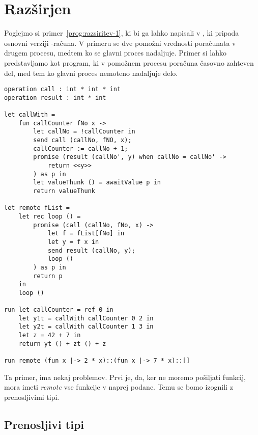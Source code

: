 \section{Razširjen \lae{}}\label{sec:razsirjen-lae}

Poglejmo si primer~\ref{prog:razsiritev-1}, ki bi ga lahko napisali v \aeff{}, ki pripada osnovni verziji \lae{}\nobreakdash-računa. V primeru se dve pomožni vrednosti poračunata v drugem procesu, medtem ko se glavni proces nadaljuje. 
Primer si lahko predstavljamo kot program, ki v pomožnem procesu poračuna časovno zahteven del, med tem ko glavni proces nemoteno nadaljuje delo.


\begin{lstlisting}[caption={Računanje zahtevne funkcije v ozadju.},label={prog:razsiritev-0},float,floatplacement=h]
operation call : int * int * int
operation result : int * int

let callWith =
	fun callCounter fNo x ->
		let callNo = !callCounter in
		send call (callNo, fNO, x);
		callCounter := callNo + 1;
		promise (result (callNo', y) when callNo = callNo' ->
			return <<y>>
		) as p in
		let valueThunk () = awaitValue p in
		return valueThunk

let remote fList =
	let rec loop () =
		promise (call (callNo, fNo, x) ->
			let f = fList[fNo] in
			let y = f x in
			send result (callNo, y);
			loop ()
		) as p in
		return p
	in
	loop ()

run	let callCounter = ref 0 in
	let y1t = callWith callCounter 0 2 in
	let y2t = callWith callCounter 1 3 in
	let z = 42 + 7 in
	return yt () + zt () + z

run remote (fun x |-> 2 * x)::(fun x |-> 7 * x)::[]
\end{lstlisting}

Ta primer, ima nekaj problemov. Prvi je, da, ker ne moremo pošiljati funkcij, mora imeti \emph{remote} vse funkcije v naprej podane. Temu se bomo izognili z prenosljivimi tipi.

\subsection{Prenosljivi tipi}

